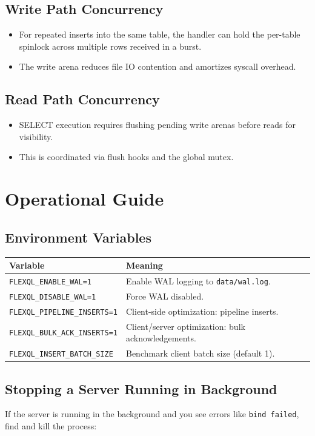 \documentclass[11pt]{article}
\begin{document}
\subsection{Write Path Concurrency}
\begin{itemize}[leftmargin=*]
\item For repeated inserts into the same table, the handler can hold the per-table spinlock across multiple rows received in a burst.
\item The write arena reduces file IO contention and amortizes syscall overhead.
\end{itemize}

\subsection{Read Path Concurrency}
\begin{itemize}[leftmargin=*]
\item SELECT execution requires flushing pending write arenas before reads for visibility.
\item This is coordinated via flush hooks and the global mutex.
\end{itemize}

\section{Operational Guide}
\subsection{Environment Variables}
\begin{longtable}{@{}lp{}@{}}
\toprule
Variable & Meaning \\
\midrule
\texttt{FLEXQL\_ENABLE\_WAL=1} & Enable WAL logging to \texttt{data/wal.log}. \\
\texttt{FLEXQL\_DISABLE\_WAL=1} & Force WAL disabled. \\
\texttt{FLEXQL\_PIPELINE\_INSERTS=1} & Client-side optimization: pipeline inserts. \\
\texttt{FLEXQL\_BULK\_ACK\_INSERTS=1} & Client/server optimization: bulk acknowledgements. \\
\texttt{FLEXQL\_INSERT\_BATCH\_SIZE} & Benchmark client batch size (default 1). \\
\bottomrule
\end{longtable}

\subsection{Stopping a Server Running in Background}
If the server is running in the background and you see errors like \texttt{bind failed}, find and kill the process:
\end{document}
